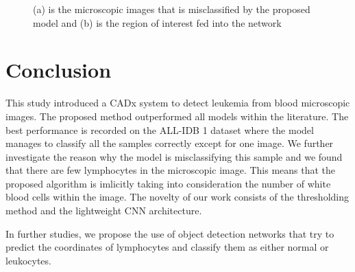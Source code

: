 \documentclass[diagnostics,article,submit,pdftex,moreauthors]{Definitions/mdpi}
\begin{document}
\begin{figure}[!h]
  \centering
 
  \quad 
  \quad  
  \caption{(a) is the microscopic images that is misclassified by the proposed model and (b) is the region of interest fed into the network}
\end{figure}

\section{Conclusion}
This study introduced a CADx system to detect leukemia from blood microscopic images. The proposed method outperformed all models within the literature. The best performance is recorded on the ALL-IDB 1 dataset where the model manages to classify all the samples correctly except for one image. We further investigate the reason why the model is misclassifying this sample and we found that there are few lymphocytes in the microscopic image. This means that the proposed algorithm is imlicitly taking into consideration the number of white blood cells within the image. The novelty of our work consists of the thresholding method and the lightweight CNN architecture.

In further studies, we propose the use of object detection networks that try to predict the coordinates of lymphocytes and classify them as either normal or leukocytes.
\end{document}
